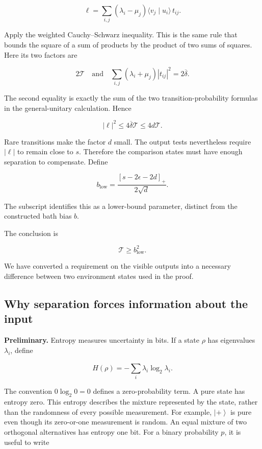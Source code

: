 \documentclass[11pt,letterpaper]{article}
\begin{document}
\[\ell = \sum_{i,j}^{}\left( \lambda_{i} - \mu_{j} \right)\langle v_{j} \mid u_{i}\rangle\, t_{ij}.\]

Apply the weighted Cauchy--Schwarz inequality. This is the same rule that bounds the square of a sum of products by the product of two sums of squares. Here its two factors are

\[2\mathcal{T}\quad\text{and}\quad\sum_{i,j}^{}\left( \lambda_{i} + \mu_{j} \right)\left| t_{ij} \right|^{2} = 2\overline{\delta}.\]

The second equality is exactly the sum of the two transition-probability formulas in the general-unitary calculation. Hence

\[|\ell|^{2} \leq 4\overline{\delta}\mathcal{T} \leq 4d\mathcal{T}.\]

Rare transitions make the factor \(d\) small. The output tests nevertheless require \(|\ell|\) to remain close to \(s\). Therefore the comparison states must have enough separation to compensate. Define

\[b_{\mathrm{low}} = \frac{[s-2\epsilon-2d]_{+}}{2\sqrt{d}}.\]

The subscript identifies this as a lower-bound parameter, distinct from the constructed bath bias \(b\).

The conclusion is

\[\mathcal{T} \geq b_{\mathrm{low}}^{2}.\]

We have converted a requirement on the visible outputs into a necessary difference between two environment states used in the proof.

\subsection{Why separation forces information about the input}\label{subsec:spectral-information}

\textbf{Preliminary.} Entropy measures uncertainty in bits. If a state \(\rho\) has eigenvalues \(\lambda_{i}\), define

\[H(\rho) = - \sum_{i}^{}\lambda_{i}\log_{2}\lambda_{i}.\]

The convention \(0\log_{2}0 = 0\) defines a zero-probability term. A pure state has entropy zero. This entropy describes the mixture represented by the state, rather than the randomness of every possible measurement. For example, \(\left| + \right\rangle\) is pure even though its zero-or-one measurement is random. An equal mixture of two orthogonal alternatives has entropy one bit. For a binary probability \(p\), it is useful to write
\end{document}
